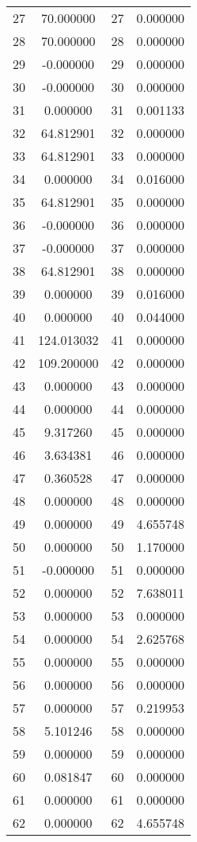 \documentclass[12pt]{article}
\begin{document}
\begin{longtable}{@{}cccc@{}}
27 & 70.000000 & 27 & 0.000000 \\
28 & 70.000000 & 28 & 0.000000 \\
29 & -0.000000 & 29 & 0.000000 \\
30 & -0.000000 & 30 & 0.000000 \\
31 & 0.000000 & 31 & 0.001133 \\
32 & 64.812901 & 32 & 0.000000 \\
33 & 64.812901 & 33 & 0.000000 \\
34 & 0.000000 & 34 & 0.016000 \\
35 & 64.812901 & 35 & 0.000000 \\
36 & -0.000000 & 36 & 0.000000 \\
37 & -0.000000 & 37 & 0.000000 \\
38 & 64.812901 & 38 & 0.000000 \\
39 & 0.000000 & 39 & 0.016000 \\
40 & 0.000000 & 40 & 0.044000 \\
41 & 124.013032 & 41 & 0.000000 \\
42 & 109.200000 & 42 & 0.000000 \\
43 & 0.000000 & 43 & 0.000000 \\
44 & 0.000000 & 44 & 0.000000 \\
45 & 9.317260 & 45 & 0.000000 \\
46 & 3.634381 & 46 & 0.000000 \\
47 & 0.360528 & 47 & 0.000000 \\
48 & 0.000000 & 48 & 0.000000 \\
49 & 0.000000 & 49 & 4.655748 \\
50 & 0.000000 & 50 & 1.170000 \\
51 & -0.000000 & 51 & 0.000000 \\
52 & 0.000000 & 52 & 7.638011 \\
53 & 0.000000 & 53 & 0.000000 \\
54 & 0.000000 & 54 & 2.625768 \\
55 & 0.000000 & 55 & 0.000000 \\
56 & 0.000000 & 56 & 0.000000 \\
57 & 0.000000 & 57 & 0.219953 \\
58 & 5.101246 & 58 & 0.000000 \\
59 & 0.000000 & 59 & 0.000000 \\
60 & 0.081847 & 60 & 0.000000 \\
61 & 0.000000 & 61 & 0.000000 \\
62 & 0.000000 & 62 & 4.655748 \\

\end{longtable}
\end{document}
